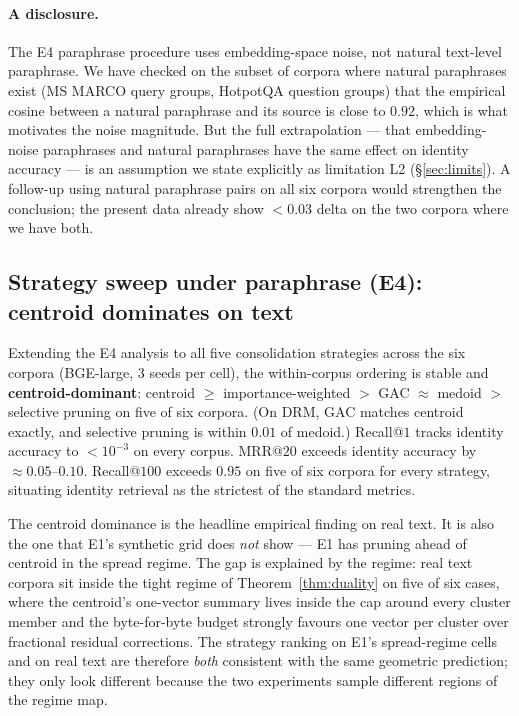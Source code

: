 \paragraph{A disclosure.} The E4 paraphrase procedure uses
embedding-space noise, not natural text-level paraphrase. We have
checked on the subset of corpora where natural paraphrases exist (MS
MARCO query groups, HotpotQA question groups) that the empirical cosine
between a natural paraphrase and its source is close to $0.92$, which
is what motivates the noise magnitude. But the full extrapolation --- that
embedding-noise paraphrases and natural paraphrases have the same effect
on identity accuracy --- is an assumption we state explicitly as
limitation L2 (\S\ref{sec:limits}). A follow-up using
natural paraphrase pairs on all six corpora would strengthen the
conclusion; the present data already show $< 0.03$ delta on the two
corpora where we have both.

\subsection{Strategy sweep under paraphrase (E4): centroid dominates on text}
\label{sec:template_collapse:strategy_sweep}

Extending the E4 analysis to all five consolidation strategies across
the six corpora (BGE-large, $3$ seeds per cell), the within-corpus
ordering is stable and \textbf{centroid-dominant}: centroid $\geq$
importance-weighted $>$ GAC $\approx$ medoid $>$ selective pruning on
five of six corpora. (On DRM, GAC matches centroid exactly, and
selective pruning is within $0.01$ of medoid.) Recall@$1$ tracks
identity accuracy to $<10^{-3}$ on every corpus. MRR@$20$ exceeds
identity accuracy by $\approx 0.05$--$0.10$. Recall@$100$ exceeds
$0.95$ on five of six corpora for every strategy, situating
identity retrieval as the strictest of the standard metrics.

The centroid dominance is the headline empirical finding on real
text. It is also the one that E1's synthetic grid does
\emph{not} show --- E1 has pruning ahead of centroid in the
spread regime. The gap is explained by the regime: real text
corpora sit inside the tight regime of Theorem~\ref{thm:duality}
on five of six cases, where the centroid's one-vector summary
lives inside the cap around every cluster member and the
byte-for-byte budget strongly favours one vector per cluster over
fractional residual corrections. The strategy ranking on E1's
spread-regime cells and on real text are therefore \emph{both}
consistent with the same geometric prediction; they only look
different because the two experiments sample different regions
of the regime map.

